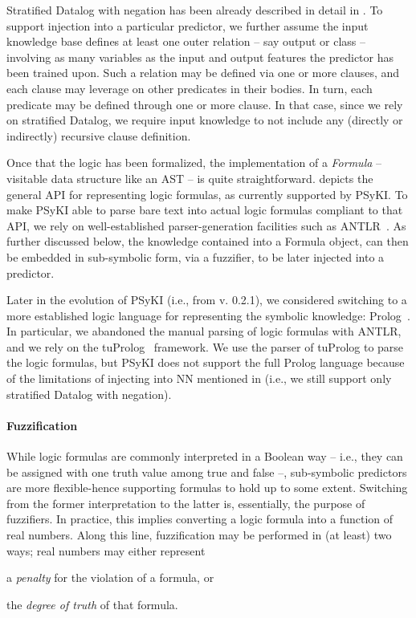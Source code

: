 Stratified Datalog with negation has been already described in detail in .
%
To support injection into a particular predictor, we further assume the input knowledge base defines at least one outer relation -- say output or class -- involving as many variables as the input and output features the predictor has been trained upon.
%
Such a relation may be defined via one or more clauses, and each clause may leverage on other predicates in their bodies.
%
In turn, each predicate may be defined through one or more clause.
%
In that case, since we rely on stratified Datalog, we require input knowledge to not include any (directly or indirectly) recursive clause definition.


Once that the logic has been formalized, the implementation of a \emph{Formula} -- visitable data structure like an \gls{AST} -- is quite straightforward.
%
 depicts the general API for representing logic formulas, as currently supported by \gls{PSyKI}.
%
To make \gls{PSyKI} able to parse bare text into actual logic formulas compliant to that API, we rely on well-established parser-generation facilities such as ANTLR~\cite{DBLP:journals/spe/ParrQ95}.
%
As further discussed below, the knowledge contained into a Formula object, can then be embedded in sub-symbolic form, via a fuzzifier, to be later injected into a predictor.


Later in the evolution of \gls{PSyKI} (i.e., from v. 0.2.1), we considered switching to a more established logic language for representing the symbolic knowledge: Prolog~\cite{DBLP:journals/tplp/KornerLBCDHMWDA22}.
%
In particular, we abandoned the manual parsing of logic formulas with ANTLR, and we rely on the tuProlog~\cite{DBLP:conf/padl/DentiOR01} framework.
%
We use the parser of tuProlog to parse the logic formulas, but \gls{PSyKI} does not support the full Prolog language because of the limitations of injecting into \gls{NN} mentioned in  (i.e., we still support only stratified Datalog with negation).


\paragraph{Fuzzification}\label{par:fuzzification}
%
While logic formulas are commonly interpreted in a Boolean way -- i.e., they can be assigned with one truth value among true and false --, sub-symbolic predictors are more flexible-hence supporting formulas to hold up to some extent.
%
Switching from the former interpretation to the latter is, essentially, the purpose of fuzzifiers.
%
In practice, this implies converting a logic formula into a function of real numbers.
%
Along this line, fuzzification may be performed in (at least) two ways; real numbers may either represent
%
\begin{inlinelist}
    \item a \emph{penalty} for the violation of a formula, or
    \item the \emph{degree of truth} of that formula.
\end{inlinelist}


